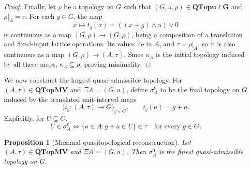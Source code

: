 \documentclass[preprint,3p]{elsarticle}
\theoremstyle{plain}
\newtheorem{prop}[thm]{Proposition}
\theoremstyle{definition}
\newcommand{\QTopMV}{\mathbf{QTopMV}}
\newcommand{\QTopulg}{\mathbf{QTopu\ell G}}
\numberwithin{equation}{section}
\begin{document}
\begin{proof}
Finally, let $\rho$ be a topology on $G$ such that
$(G,u,\rho)\in\QTopulg$ and $\rho|_A=\tau$.
For each $g\in G$, the map
\[
 x\mapsto t_g(x)=((x+g)\wedge u)\vee0
\]
is continuous as a map $(G,\rho)\longrightarrow(G,\rho)$,
being a composition of a translation and fixed-input lattice
operations.  Its values lie in $A$, and $\tau=\rho|_A$,
so it is also continuous as a map
$(G,\rho)\longrightarrow(A,\tau)$.
Since $\kappa_A$ is the initial topology induced by all these
maps, $\kappa_A\subseteq\rho$, proving minimality.
\end{proof}

We now construct the largest quasi-admissible topology.
For $(A,\tau)\in\QTopMV$ and $\Xi A=(G,u)$, define
$\sigma_A^{\mathrm q}$ to be the final topology on $G$ induced
by the translated unit-interval maps
\[
 \bigl(i_g\colon(A,\tau)\longrightarrow G\bigr)_{g\in G},
 \qquad i_g(a)=g+a.
\]
Explicitly, for $U\subseteq G$,
\begin{equation}
\label{eq-quasi-translated-final-test}
 U\in\sigma_A^{\mathrm q}
 \iff
 \{a\in A:g+a\in U\}\in\tau
 \quad\text{for every }g\in G.
\end{equation}

\begin{prop}[Maximal quasitopological reconstruction]
\label{prop-quasi-translated-final}
Let $(A,\tau)\in\QTopMV$ and $\Xi A=(G,u)$. Then
$\sigma_A^{\mathrm q}$ is the finest quasi-admissible topology on $G$.
\end{prop}
\end{document}
